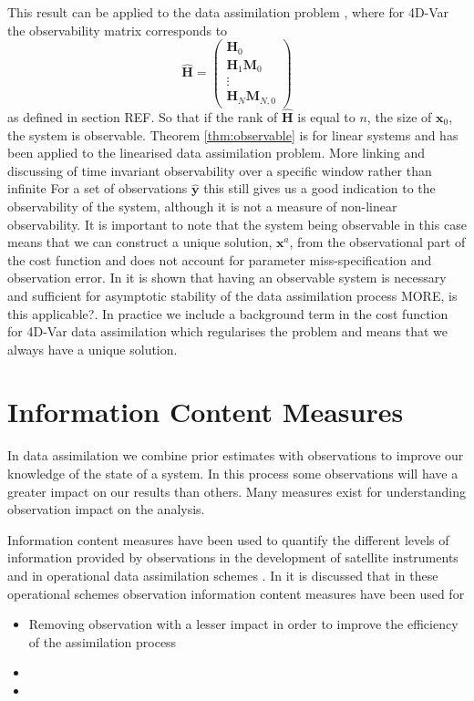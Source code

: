 \documentclass[11pt]{article}
\begin{document}
This result can be applied to the data assimilation problem \citep{johnson2005singular}, where for 4D-Var the observability matrix corresponds to
\begin{equation}
\hat{\mathbf{H}}=
\begin{pmatrix}
\mathbf{H}_0 \\
\mathbf{H}_1\mathbf{M}_0\\
\vdots \\
\mathbf{H}_N\mathbf{M}_{N,0}
\end{pmatrix} \label{eqn: hmat}
\end{equation}
as defined in section {\color{red} REF}. So that if the rank of $\hat{\textbf{H}}$ is equal to $n$, the size of $\textbf{x}_0$, the system is observable. Theorem \ref{thm:observable} is for linear systems and has been applied to the linearised data assimilation problem. {\color{red} More linking and discussing of time invariant observability over a specific window rather than infinite} For a set of observations $\hat{\textbf{y}}$ this still gives us a good indication to the observability of the system, although it is not a measure of non-linear observability. It is important to note that the system being observable in this case means that we can construct a unique solution, $\textbf{x}^a$, from the observational part of the cost function and does not account for parameter miss-specification and observation error. In \citet{Cohn1988} it is shown that having an observable system is necessary and sufficient for asymptotic stability of the data assimilation process {\color{red} MORE, is this applicable?}. In practice we include a background term in the cost function for 4D-Var data assimilation which regularises the problem and means that we always have a unique solution.

\section{Information Content Measures} \label{sec:IC}%

In data assimilation we combine prior estimates with observations to improve our knowledge of the state of a system. In this process some observations will have a greater impact on our results than others. Many measures exist for understanding observation impact on the analysis.

Information content measures have been used to quantify the different levels of information provided by observations in the development of satellite instruments \citep{stewart2008correlated, engelen2004information} and in operational data assimilation schemes \citep{fisher2003estimation, singh2013practical}. In \citet{Fowler2013} it is discussed that in these operational schemes observation information content measures have been used for
\begin{itemize}
\item Removing observation with a lesser impact in order to improve the efficiency of the assimilation process \citet{rabier2002channel, singh2013practical, rodgers1998information}
\item 
\item
\end{itemize}
\end{document}
